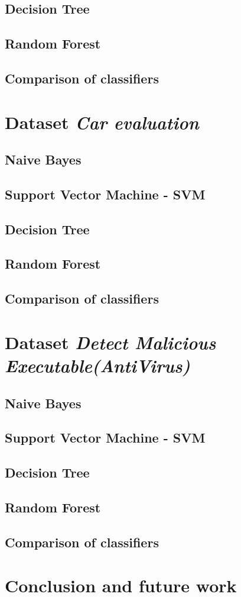 \documentclass[11pt,a4paper,titlepage]{article}
\begin{document}
\subsection{Decision Tree}
\subsection{Random Forest}
\subsection{Comparison of classifiers}

\section{Dataset \textit{Car evaluation}}
\subsection{Naive Bayes}
\subsection{Support Vector Machine - SVM}
\subsection{Decision Tree}
\subsection{Random Forest}
\subsection{Comparison of classifiers}

\section{Dataset \textit{Detect Malicious Executable(AntiVirus)}}
\subsection{Naive Bayes}
\subsection{Support Vector Machine - SVM}
\subsection{Decision Tree}
\subsection{Random Forest}
\subsection{Comparison of classifiers}

\section{Conclusion and future work}
\end{document}
